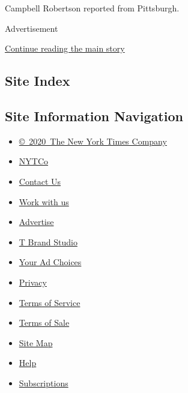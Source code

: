 Campbell Robertson reported from Pittsburgh.

Advertisement

\protect\hyperlink{after-bottom}{Continue reading the main story}

\hypertarget{site-index}{%
\subsection{Site Index}\label{site-index}}

\hypertarget{site-information-navigation}{%
\subsection{Site Information
Navigation}\label{site-information-navigation}}

\begin{itemize}
\tightlist
\item
  \href{https://help.nytimes.com/hc/en-us/articles/115014792127-Copyright-notice}{©~2020~The
  New York Times Company}
\end{itemize}

\begin{itemize}
\tightlist
\item
  \href{https://www.nytco.com/}{NYTCo}
\item
  \href{https://help.nytimes.com/hc/en-us/articles/115015385887-Contact-Us}{Contact
  Us}
\item
  \href{https://www.nytco.com/careers/}{Work with us}
\item
  \href{https://nytmediakit.com/}{Advertise}
\item
  \href{http://www.tbrandstudio.com/}{T Brand Studio}
\item
  \href{https://www.nytimes.com/privacy/cookie-policy\#how-do-i-manage-trackers}{Your
  Ad Choices}
\item
  \href{https://www.nytimes.com/privacy}{Privacy}
\item
  \href{https://help.nytimes.com/hc/en-us/articles/115014893428-Terms-of-service}{Terms
  of Service}
\item
  \href{https://help.nytimes.com/hc/en-us/articles/115014893968-Terms-of-sale}{Terms
  of Sale}
\item
  \href{https://spiderbites.nytimes.com}{Site Map}
\item
  \href{https://help.nytimes.com/hc/en-us}{Help}
\item
  \href{https://www.nytimes.com/subscription?campaignId=37WXW}{Subscriptions}
\end{itemize}
